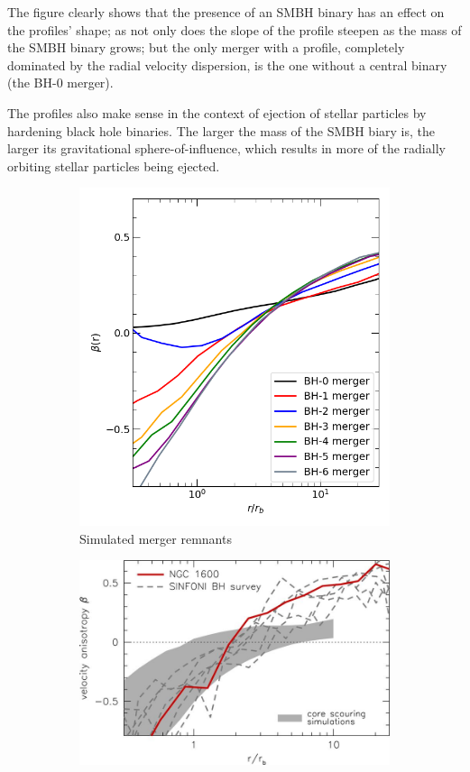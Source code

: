 \documentclass[english, oneside]{HYgradu}
\begin{document}
The figure clearly shows that the presence of an SMBH binary has an effect on the profiles' shape; as not only does the slope of the profile steepen as the mass of the SMBH binary grows; but the only merger with a profile, completely dominated by the radial velocity dispersion, is the one without a central binary (the BH-0 merger). 

The profiles also make sense in the context of ejection of stellar particles by hardening black hole binaries. The larger the mass of the SMBH biary is, the larger its gravitational sphere-of-influence, which results in more of the radially orbiting stellar particles being ejected.

\begin{figure}
	\centering
	\begin{subfigure}[b]{0.39\textwidth}
		\includegraphics[width=\textwidth]{beta.png}	
		\caption{Simulated merger remnants}
	\end{subfigure}
	\begin{subfigure}[b]{0.60\textwidth}
		\includegraphics[width=\textwidth]{thomas2016.jpg}

\end{subfigure}
\end{figure}
\end{document}
